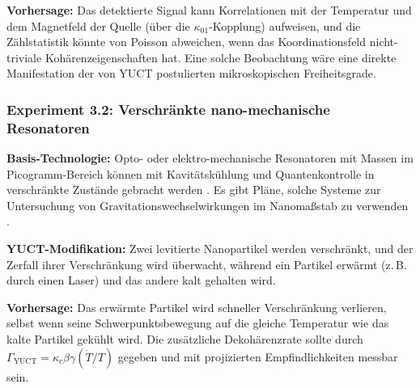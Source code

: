 \documentclass[12pt]{article}
\theoremstyle{remark}
\begin{document}
	\textbf{Vorhersage:} Das detektierte Signal kann Korrelationen mit der Temperatur und dem Magnetfeld der Quelle (über die \(\kappa_{01}\)-Kopplung) aufweisen, und die Zählstatistik könnte von Poisson abweichen, wenn das Koordinationsfeld nicht-triviale Kohärenzeigenschaften hat. Eine solche Beobachtung wäre eine direkte Manifestation der von YUCT postulierten mikroskopischen Freiheitsgrade.
	
	\subsubsection{Experiment 3.2: Verschränkte nano-mechanische Resonatoren}
	
	\textbf{Basis-Technologie:} Opto- oder elektro-mechanische Resonatoren mit Massen im Picogramm-Bereich können mit Kavitätskühlung und Quantenkontrolle in verschränkte Zustände gebracht werden \cite{Aspelmeyer2014}. Es gibt Pläne, solche Systeme zur Untersuchung von Gravitationswechselwirkungen im Nanomaßstab zu verwenden \cite{Geraci2010}.
	
	\textbf{YUCT-Modifikation:} Zwei levitierte Nanopartikel werden verschränkt, und der Zerfall ihrer Verschränkung wird überwacht, während ein Partikel erwärmt (z. B. durch einen Laser) und das andere kalt gehalten wird.
	
	\textbf{Vorhersage:} Das erwärmte Partikel wird schneller Verschränkung verlieren, selbst wenn seine Schwerpunktsbewegung auf die gleiche Temperatur wie das kalte Partikel gekühlt wird. Die zusätzliche Dekohärenzrate sollte durch \(\Gamma_{\mathrm{YUCT}} = \kappa_c \beta\gamma (\dot{T}/T)\) gegeben und mit projizierten Empfindlichkeiten messbar sein.
	
\end{document}
